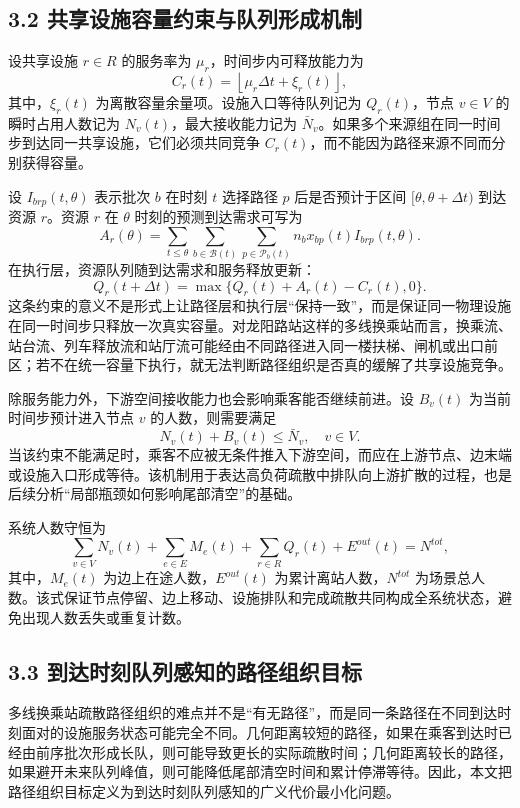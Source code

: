 \documentclass[UTF8,a4paper,12pt]{ctexart}
\begin{document}
\subsection{3.2 共享设施容量约束与队列形成机制}

设共享设施 \(r\in R\) 的服务率为 \(\mu_r\)，时间步内可释放能力为
\[
C_r(t)=\left\lfloor \mu_r\Delta t+\xi_r(t)\right\rfloor,
\]
其中，\(\xi_r(t)\) 为离散容量余量项。设施入口等待队列记为 \(Q_r(t)\)，节点 \(v\in V\) 的瞬时占用人数记为 \(N_v(t)\)，最大接收能力记为 \(\bar N_v\)。如果多个来源组在同一时间步到达同一共享设施，它们必须共同竞争 \(C_r(t)\)，而不能因为路径来源不同而分别获得容量。

设 \(I_{brp}(t,\theta)\) 表示批次 \(b\) 在时刻 \(t\) 选择路径 \(p\) 后是否预计于区间 \([\theta,\theta+\Delta t)\) 到达资源 \(r\)。资源 \(r\) 在 \(\theta\) 时刻的预测到达需求可写为
\[
A_r(\theta)=
\sum_{t\leq \theta}\sum_{b\in\mathcal B(t)}
\sum_{p\in\mathcal P_b(t)}
n_bx_{bp}(t)I_{brp}(t,\theta).
\]
在执行层，资源队列随到达需求和服务释放更新：
\[
Q_r(t+\Delta t)=\max\{Q_r(t)+A_r(t)-C_r(t),0\}.
\]
这条约束的意义不是形式上让路径层和执行层“保持一致”，而是保证同一物理设施在同一时间步只释放一次真实容量。对龙阳路站这样的多线换乘站而言，换乘流、站台流、列车释放流和站厅流可能经由不同路径进入同一楼扶梯、闸机或出口前区；若不在统一容量下执行，就无法判断路径组织是否真的缓解了共享设施竞争。

除服务能力外，下游空间接收能力也会影响乘客能否继续前进。设 \(B_v(t)\) 为当前时间步预计进入节点 \(v\) 的人数，则需要满足
\[
N_v(t)+B_v(t)\leq \bar N_v,\quad v\in V.
\]
当该约束不能满足时，乘客不应被无条件推入下游空间，而应在上游节点、边末端或设施入口形成等待。该机制用于表达高负荷疏散中排队向上游扩散的过程，也是后续分析“局部瓶颈如何影响尾部清空”的基础。

系统人数守恒为
\[
\sum_{v\in V}N_v(t)+\sum_{e\in E}M_e(t)+\sum_{r\in R}Q_r(t)+E^{out}(t)=N^{tot},
\]
其中，\(M_e(t)\) 为边上在途人数，\(E^{out}(t)\) 为累计离站人数，\(N^{tot}\) 为场景总人数。该式保证节点停留、边上移动、设施排队和完成疏散共同构成全系统状态，避免出现人数丢失或重复计数。

\subsection{3.3 到达时刻队列感知的路径组织目标}

多线换乘站疏散路径组织的难点并不是“有无路径”，而是同一条路径在不同到达时刻面对的设施服务状态可能完全不同。几何距离较短的路径，如果在乘客到达时已经由前序批次形成长队，则可能导致更长的实际疏散时间；几何距离较长的路径，如果避开未来队列峰值，则可能降低尾部清空时间和累计停滞等待。因此，本文把路径组织目标定义为到达时刻队列感知的广义代价最小化问题。
\end{document}
